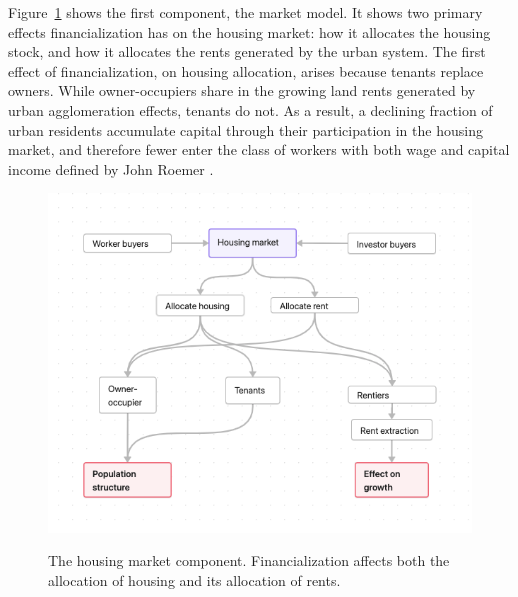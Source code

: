 Figure~\ref{fig-impacts} shows the first component, the market model.
It shows two primary effects financialization has on the housing market: how it allocates %
the housing stock, and how it allocates the \glspl{rent} generated by the urban system. %
The first effect of financialization, on housing allocation, arises because tenants replace owners. While owner-occupiers share in the growing land rents generated by urban agglomeration effects, tenants do not. As a result, a declining fraction of urban residents accumulate capital through their participation in the housing market, and therefore fewer enter the class of workers with both wage and capital income defined by John Roemer \cite{roemerGeneralTheoryExploitation1982}. 

\begin{figure}[!ht]
    \centering
    \includegraphics[scale=.60]{fig/flow_impacts.png}
    \label{fig-impacts}
\caption[The housing market component of the model.]{The housing market component. Financialization affects both the allocation of housing and its allocation of rents.}
\end{figure}


